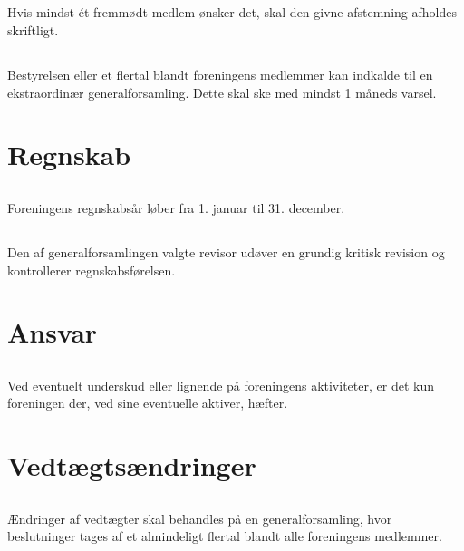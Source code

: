 \documentclass[danish,a4paper,twocolumn,oneside,article]{memoir}
\begin{document}
\section{} Hvis mindst ét fremmødt medlem ønsker det, skal den givne afstemning afholdes skriftligt.

\section{} Bestyrelsen eller et flertal blandt foreningens medlemmer kan indkalde til en ekstraordinær
generalforsamling. Dette skal ske med mindst 1 måneds varsel.


\chapter{Regnskab}

\section{} Foreningens regnskabsår løber fra 1. januar til 31. december.

\section{} Den af generalforsamlingen valgte revisor udøver en grundig kritisk revision og kontrollerer
regnskabsførelsen.


\chapter{Ansvar}

\section{} Ved eventuelt underskud eller lignende på foreningens aktiviteter, er det kun foreningen der, ved
sine eventuelle aktiver, hæfter.


\chapter{Vedtægtsændringer}

\section{} Ændringer af vedtægter skal behandles på en generalforsamling, hvor beslutninger tages af et
almindeligt flertal blandt alle foreningens medlemmer.
\end{document}
